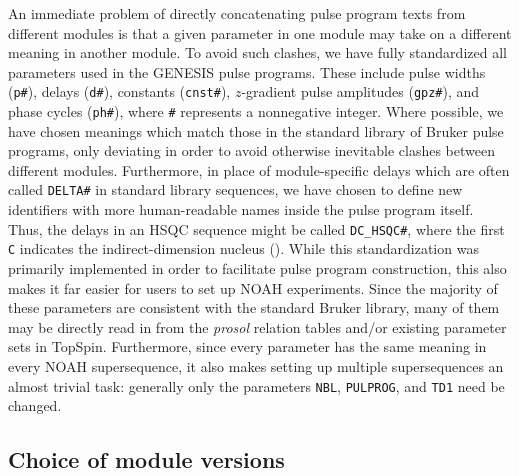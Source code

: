 \documentclass[a4paper,11pt]{article}
\newcommand{\carbon}{\ch{^{13}C}}
\begin{document}
\begin{refsection}
An immediate problem of directly concatenating pulse program texts from different modules is that a given parameter in one module may take on a different meaning in another module.
To avoid such clashes, we have fully standardized all parameters used in the GENESIS pulse programs.
These include pulse widths (\texttt{p\#}), delays (\texttt{d\#}), constants (\texttt{cnst\#}), \(z\)-gradient pulse amplitudes (\texttt{gpz\#}), and phase cycles (\texttt{ph\#}), where \texttt{\#} represents a nonnegative integer.
Where possible, we have chosen meanings which match those in the standard library of Bruker pulse programs, only deviating in order to avoid otherwise inevitable clashes between different modules.
Furthermore, in place of module-specific delays which are often called \texttt{DELTA\#} in standard library sequences, we have chosen to define new identifiers with more human-readable names inside the pulse program itself.
Thus, the delays in an HSQC sequence might be called \texttt{DC\_HSQC\#}, where the first \texttt{C} indicates the indirect-dimension nucleus (\carbon{}).
While this standardization was primarily implemented in order to facilitate pulse program construction, this also makes it far easier for users to set up NOAH experiments.
Since the majority of these parameters are consistent with the standard Bruker library, many of them may be directly read in from the \textit{prosol} relation tables and/or existing parameter sets in TopSpin.
Furthermore, since every parameter has the same meaning in every NOAH supersequence, it also makes setting up multiple supersequences an almost trivial task: generally only the parameters \texttt{NBL}, \texttt{PULPROG}, and \texttt{TD1} need be changed.


\subsection{Choice of module versions}


\end{refsection}
\end{document}
